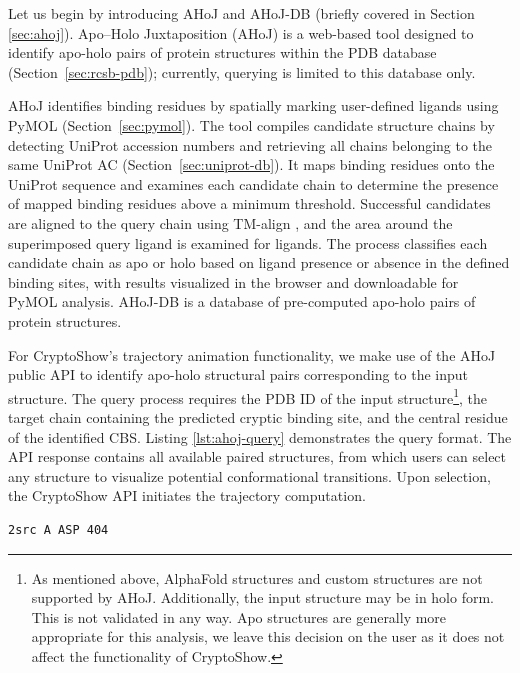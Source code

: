 Let us begin by introducing AHoJ \cite{feidakis2022ahoj} and AHoJ-DB \cite{feidakis2024ahoj} (briefly covered in Section \ref{sec:ahoj}). Apo–Holo Juxtaposition (AHoJ) is a web-based tool designed to identify apo-holo pairs of protein structures within the PDB database (Section~\ref{sec:rcsb-pdb}); currently, querying is limited to this database only.

AHoJ identifies binding residues by spatially marking user-defined ligands using PyMOL (Section~\ref{sec:pymol}). The tool compiles candidate structure chains by detecting UniProt accession numbers and retrieving all chains belonging to the same UniProt AC (Section~\ref{sec:uniprot-db}). It maps binding residues onto the UniProt sequence and examines each candidate chain to determine the presence of mapped binding residues above a minimum threshold. Successful candidates are aligned to the query chain using TM-align \cite{zhang2005tm}, and the area around the superimposed query ligand is examined for ligands. The process classifies each candidate chain as apo or holo based on ligand presence or absence in the defined binding sites, with results visualized in the browser and downloadable for PyMOL analysis. AHoJ-DB is a database of pre-computed apo-holo pairs of protein structures.

For CryptoShow's trajectory animation functionality, we make use of the AHoJ public API to identify apo-holo structural pairs corresponding to the input structure. The query process requires the PDB ID of the input structure\footnote{As mentioned above, AlphaFold structures and custom structures are not supported by AHoJ. Additionally, the input structure may be in holo form. This is not validated in any way. Apo structures are generally more appropriate for this analysis, we leave this decision on the user as it does not affect the functionality of CryptoShow.}, the target chain containing the predicted cryptic binding site, and the central residue of the identified CBS. Listing \ref{lst:ahoj-query} demonstrates the query format. The API response contains all available paired structures, from which users can select any structure to visualize potential conformational transitions. Upon selection, the CryptoShow API initiates the trajectory computation.

\begin{lstlisting}[caption={Sample query format for the AHoJ tool, specifying PDB ID 2src, chain A, aspartic acid residue at position 404}, label={lst:ahoj-query}]
    2src A ASP 404
\end{lstlisting}

